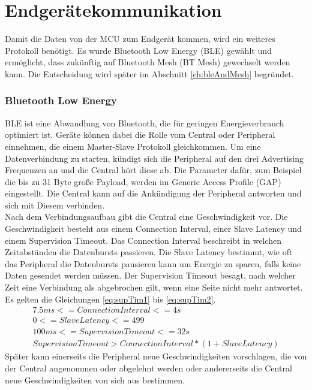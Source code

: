\section{Endgerätekommunikation}
Damit die Daten von der MCU zum Endgerät kommen, wird ein weiteres Protokoll benötigt.
Es wurde Bluetooth Low Energy (BLE) gewählt und ermöglicht, dass zukünftig auf Bluetooth Mesh (BT Mesh) gewechselt werden kann.
Die Entscheidung wird später im Abschnitt \ref{ch:bleAndMesh} begründet.

\subsubsection{Bluetooth Low Energy}
BLE ist eine Abwandlung von Bluetooth, die für geringen Energieverbrauch optimiert ist.
Geräte können dabei die Rolle vom Central oder Peripheral einnehmen, die einem Master-Slave Protokoll gleichkommen.
Um eine Datenverbindung zu starten, kündigt sich die Peripheral auf den drei Advertising Frequenzen an und die Central hört diese ab.
Die Parameter dafür, zum Beispiel die bis zu 31 Byte große Payload, werden im Generic Access Profile (GAP) eingestellt.
Die Central kann auf die Ankündigung der Peripheral antworten und sich mit Diesem verbinden. \cite{site_adabt}\\
Nach dem Verbindungsaufbau gibt die Central eine Geschwindigkeit vor.
Die Geschwindigkeit besteht aus einem Connection Interval, einer Slave Latency und einem Supervision Timeout.
Das Connection Interval beschreibt in welchen Zeitabständen die Datenbursts passieren.
Die Slave Latency bestimmt, wie oft das Peripheral die Datenbursts pausieren kann um Energie zu sparen, falls keine Daten gesendet werden müssen.
Der Supervision Timeout besagt, nach welcher Zeit eine Verbindung als abgebrochen gilt, wenn eine Seite nicht mehr antwortet.
Es gelten die Gleichungen \ref{eq:supTim1} bis \ref{eq:supTim2}.
\begin{gather}
  \label{eq:supTim1}
	7.5 ms <= Connection Interval <= 4 s\\
	0 <= Slave Latency <= 499\\
	100 ms <= Supervision Timeout <= 32 s\\
  \label{eq:supTim2}
	Supervision Timeout > Connection Interval * (1 + Slave Latency)
\end{gather}
Später kann einerseits die Peripheral neue Geschwindigkeiten vorschlagen, die von der Central angenommen oder abgelehnt werden oder andererseits die Central neue Geschwindigkeiten von sich aus bestimmen. \cite{site_tigap}\\
